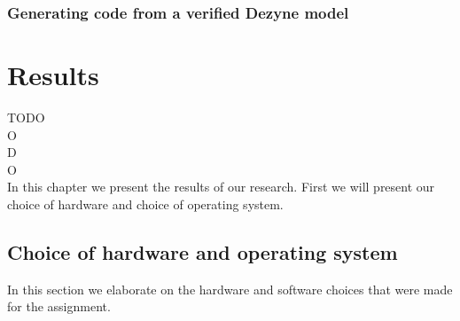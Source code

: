 \documentclass[12pt]{scrreprt}
\begin{document}
\subsection{Generating code from a verified Dezyne model}
\label{Generating code from a verified Dezyne model}


\chapter{Results}
TODO\\
O\\
D\\
O\\
In this chapter we present the results of our research. First we will present our choice of hardware and choice of operating system.

\section{Choice of hardware and operating system}
\label{Choice of hardware and software}
In this section we elaborate on the hardware and software choices that were made for the assignment.
\end{document}
